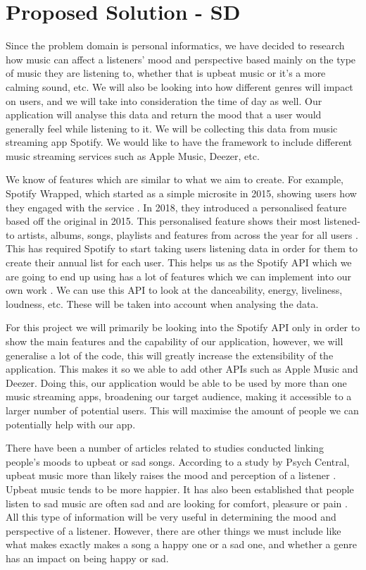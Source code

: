 \documentclass[12pt]{report}
\begin{document}
\section{Proposed Solution - SD}

Since the problem domain is personal informatics, we have decided to research how music can affect a listeners' mood and perspective based mainly on the type of music they are listening to, whether that is upbeat music or it’s a more calming sound, etc. We will also be looking into how different genres will impact on users, and we will take into consideration the time of day as well. Our application will analyse this data and return the mood that a user would generally feel while listening to it. We will be collecting this data from music streaming app Spotify. We would like to have the framework to include different music streaming services such as Apple Music, Deezer, etc.

We know of features which are similar to what we aim to create. For example, Spotify Wrapped, which started as a simple microsite in 2015, showing users how they engaged with the service \cite{Swant}. In 2018, they introduced a personalised feature based off the original in 2015. This personalised feature shows their most listened-to artists, albums, songs, playlists and features from across the year for all users \cite{Somerville}. This has required Spotify to start taking users listening data in order for them to create their annual list for each user. This helps us as the Spotify API which we are going to end up using has a lot of features which we can implement into our own work \cite{WebAPI}. We can use this API to look at the danceability, energy, liveliness, loudness, etc. These will be taken into account when analysing the data.

For this project we will primarily be looking into the Spotify API only in order to show the main features and the capability of our application, however, we will generalise a lot of the code, this will greatly increase the extensibility of the application. This makes it so we able to add other APIs such as Apple Music and Deezer. Doing this, our application would be able to be used by more than one music streaming apps, broadening our target audience, making it accessible to a larger number of potential users. This will maximise the amount of people we can potentially help with our app.

There have been a number of articles related to studies conducted linking people’s moods to upbeat or sad songs. According to a study by Psych Central, upbeat music more than likely raises the mood and perception of a listener \cite{Nauert2018}. Upbeat music tends to be more happier. It has also been established that people listen to sad music are often sad and are looking for comfort, pleasure or pain \cite{Eerola2016}. All this type of information will be very useful in determining the mood and perspective of a listener. However, there are other things we must include like what makes exactly makes a song a happy one or a sad one, and whether a genre has an impact on being happy or sad.
\end{document}
